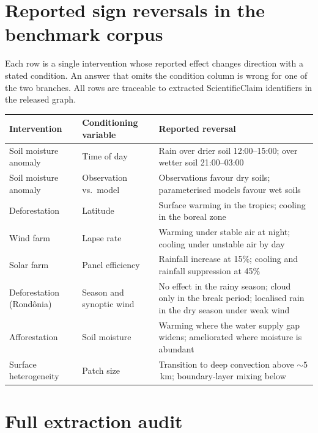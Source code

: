 \section{Reported sign reversals in the benchmark corpus}
\label{app:reversals}

Each row is a single intervention whose reported effect changes direction with a
stated condition. An answer that omits the condition column is wrong for one of the
two branches. All rows are traceable to extracted ScientificClaim identifiers in the
released graph.

\begin{table}[h]
\centering
\small
\begin{tabular}{@{}p{2.8cm}p{3.2cm}p{7.2cm}@{}}
\toprule
\textbf{Intervention} & \textbf{Conditioning variable} & \textbf{Reported reversal} \\
\midrule
Soil moisture anomaly & Time of day~\citep{taylor2012afternoon} & Rain over drier soil 12:00--15:00; over wetter soil 21:00--03:00 \\
Soil moisture anomaly & Observation vs.\ model~\citep{taylor2012afternoon} & Observations favour dry soils; parameterised models favour wet soils \\
Deforestation & Latitude~\citep{luo2024decreased} & Surface warming in the tropics; cooling in the boreal zone \\
Wind farm & Lapse rate~\citep{roy2010impacts} & Warming under stable air at night; cooling under unstable air by day \\
Solar farm & Panel efficiency~\citep{li2018sahara} & Rainfall increase at 15\%; cooling and rainfall suppression at 45\% \\
Deforestation (Rond\^onia) & Season and synoptic wind~\citep{wang1999amazonia} & No effect in the rainy season; cloud only in the break period; localised rain in the dry season under weak wind \\
Afforestation & Soil moisture~\citep{swann2012midlatitude} & Warming where the water supply gap widens; ameliorated where moisture is abundant \\
Surface heterogeneity & Patch size~\citep{lee2019heterogeneity} & Transition to deep convection above ${\sim}5$\,km; boundary-layer mixing below \\
\bottomrule
\end{tabular}
\end{table}

\section{Full extraction audit}
\label{app:extraction}

